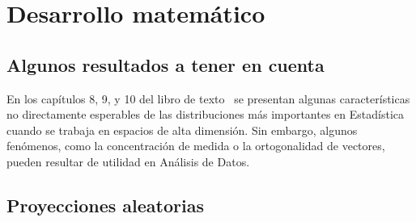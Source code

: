 \chapter{Desarrollo matemático}

\section{Algunos resultados a tener en cuenta}

En los capítulos 8, 9, y 10 del libro de texto~\cite{Wegner2024}
se presentan algunas características no directamente esperables de
las distribuciones más importantes en Estadística cuando se trabaja
en espacios de alta dimensión.
Sin embargo, algunos fenómenos, como la concentración de medida o la
ortogonalidad de vectores, pueden resultar de utilidad en Análisis de
Datos.

\section{Proyecciones aleatorias}

